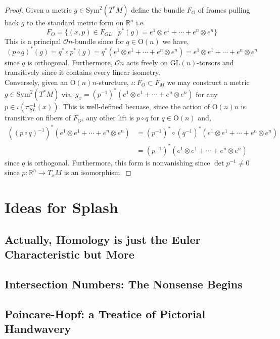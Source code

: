 \documentclass[12pt]{extarticle}
\newcommand{\R}{\mathbb{R}}
\theoremstyle{definition}
\renewcommand{\O}{\mathcal{O}}
\newcommand{\GL}[1]{\mathrm{GL}\left(#1\right)}
\newcommand{\Orth}[1]{\mathrm{O}\left(#1\right)}
\begin{document}
\begin{proof}
Given a metric $g \in \mathrm{Sym}^2(T^*M)$ define the bundle $F_{O}$ of frames pulling back $g$ to the standard metric form on $\R^n$ i.e. 
\[ F_{O} = \{ (x, p) \in F_{GL} \mid p^*(g) = e^1 \otimes e^1 + \cdots + e^n \otimes e^n \} \]
This is a principal $\O{n}$-bundle since for $q \in \Orth{n}$ we have,
\[ (p \circ q)^*(g) = q^* \circ p^*(g) = q^*(e^1 \otimes e^1 + \cdots + e^n \otimes e^n) = e^1 \otimes e^1 + \cdots + e^n \otimes e^n \]
since $q$ is orthogonal. Furthermore, $\O{n}$ acts freely on $\GL{n}$-torsors and transitively since it contains every linear isometry. 
\bigskip\\
Conversely, given an $\Orth{n}{n}$-sturcture, $\iota: F_{O} \subset F_{M}$ we may construct a metric $g \in \mathrm{Sym}^2(T^*M)$ via, $g_x = (p^{-1})^*(e^1 \otimes e^1 + \cdots + e^n \otimes e^n)$ for any $p \in \iota(\pi_{SL}^{-1}(x))$. This is well-defined becuase, since the action of $\Orth{n}{n}$ is transitive on fibers of $F_{O}$, any other lift is $p \circ q$ for $q \in \Orth{n}$ and,
\begin{align*}
((p \circ q)^{-1})^*(e^1 \otimes e^1 + \cdots + e^n \otimes e^n) & = (p^{-1})^* \circ (q^{-1})^*(e^1 \otimes e^1 + \cdots + e^n \otimes e^n) 
\\
& = (p^{-1})^*(e^1 \otimes e^1 + \cdots + e^n \otimes e^n)
\end{align*}
since $q$ is orthogonal. Furthermore, this form is nonvanishing since $\det{p^{-1}} \neq 0$ since $p : \R^n \to T_x M$ is an isomorphism. 
\end{proof}

\section{Ideas for Splash}

\subsection{Actually, Homology is just the Euler Characteristic but More}

\subsection{Intersection Numbers: The Nonsense Begins}

\subsection{Poincare-Hopf: a Treatice of Pictorial Handwavery}
\end{document}
